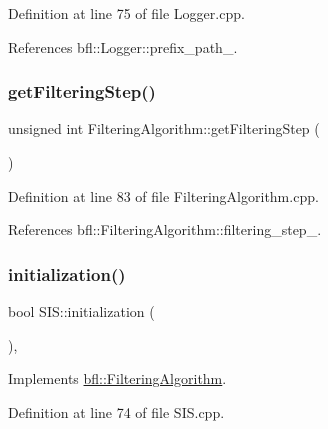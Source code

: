 Definition at line 75 of file Logger.\+cpp.



References bfl\+::\+Logger\+::prefix\+\_\+path\+\_\+.

\mbox{\label{classbfl_1_1FilteringAlgorithm_a8c43b1f3dac30934c0a03de348d4a29d}} 
\subsubsection{\texorpdfstring{get\+Filtering\+Step()}{getFilteringStep()}}
{\footnotesize\ttfamily unsigned int Filtering\+Algorithm\+::get\+Filtering\+Step (\begin{DoxyParamCaption}{ }\end{DoxyParamCaption})\hspace{0.3cm}{\ttfamily [inherited]}}



Definition at line 83 of file Filtering\+Algorithm.\+cpp.



References bfl\+::\+Filtering\+Algorithm\+::filtering\+\_\+step\+\_\+.

\mbox{\label{classbfl_1_1SIS_a59e4f35fc05d2088e6dc13d622cafd1d}} 
\subsubsection{\texorpdfstring{initialization()}{initialization()}}
{\footnotesize\ttfamily bool S\+I\+S\+::initialization (\begin{DoxyParamCaption}{ }\end{DoxyParamCaption})\hspace{0.3cm}{\ttfamily [override]}, {\ttfamily [virtual]}}



Implements \mbox{\hyperlink{classbfl_1_1FilteringAlgorithm_adebe2ec2372f97a2a5baecf8c2c2a9c9}{bfl\+::\+Filtering\+Algorithm}}.



Definition at line 74 of file S\+I\+S.\+cpp.

\mbox{\label{classbfl_1_1FilteringAlgorithm_a5cfecab2c778620e2557237472bb1721}} 
